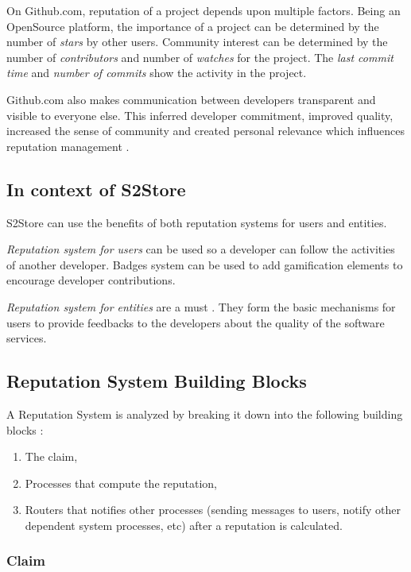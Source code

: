 On Github.com, reputation of a project depends upon multiple factors. Being an OpenSource platform, the importance of a project can be determined by the number of \textit{stars} by other users. Community interest can be determined by the number of \textit{contributors} and number of \textit{watches} for the project. The \textit{last commit time} and \textit{number of commits} show the activity in the project. 

Github.com also makes communication between developers transparent and visible to everyone else. This inferred developer commitment, improved quality, increased the sense of community and created personal relevance which influences reputation management \cite{dabbish2012social}.

\subsection*{In context of S2Store}

S2Store can use the benefits of both reputation systems for users and entities.

\emph{Reputation system for users} can be used so a developer can follow the activities of another developer. Badges system can be used to add gamification elements to encourage developer contributions.

\emph{Reputation system for entities} are a must \cite{farmer2010building}\cite{Resnick2000}. They form the basic mechanisms for users to provide feedbacks to the developers about the quality of the software services.

\subsection{Reputation System Building Blocks}

A Reputation System is analyzed by breaking it down into the following building blocks \cite{Resnick2000}:

\begin{enumerate}
  \item The claim,
  \item Processes that compute the reputation,
  \item Routers that notifies other processes (sending messages to users, notify other dependent system processes, etc) after a reputation is calculated.
\end{enumerate}

\subsubsection{Claim}

